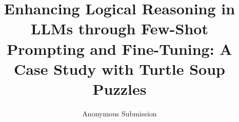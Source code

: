 \documentclass[conference]{IEEEtran}
\begin{document}
\title{Enhancing Logical Reasoning in LLMs through Few-Shot Prompting and Fine-Tuning: A Case Study with Turtle Soup Puzzles}

\author{Anonymous Submission}

\maketitle
\end{document}
